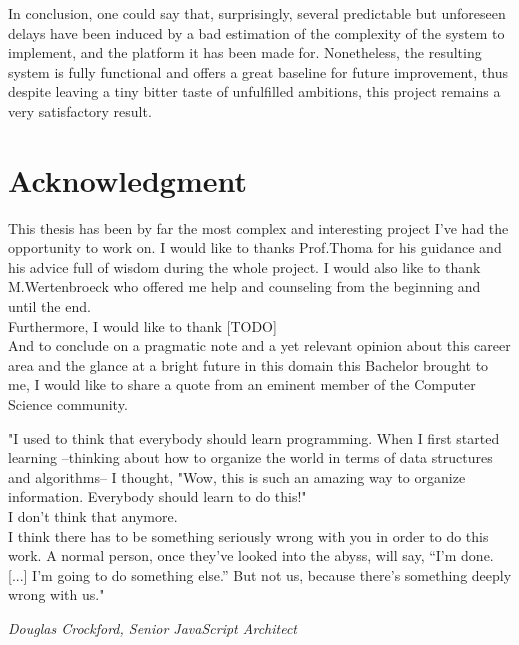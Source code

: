 In conclusion, one could say that, surprisingly, several predictable but unforeseen delays have been induced by a bad estimation of the complexity of the system to implement, and the platform it has been made for. Nonetheless, the resulting system is fully functional and offers a great baseline for future improvement, thus despite leaving a tiny bitter taste of unfulfilled ambitions, this project remains a very satisfactory result.

\section{Acknowledgment}

This thesis has been by far the most complex and interesting project I've had the opportunity to work on. I would like to thanks Prof.Thoma for his guidance and his advice full of wisdom during the whole project. I would also like to thank M.Wertenbroeck who offered me help and counseling from the beginning and until the end. \\

Furthermore, I would like to thank [TODO]\\

And to conclude on a pragmatic note and a yet relevant opinion about this career area and the glance at a bright future in this domain this Bachelor brought to me, I would like to share a quote from an eminent member of the Computer Science community.


\epigraph{"I used to think that everybody should learn programming. When I first started learning –thinking about how to organize the world in terms of data structures and algorithms– I thought, "Wow, this is such an amazing way to organize information. Everybody should learn to do this!" \\

I don't think that anymore. \\

I think there has to be something seriously wrong with you in order to do this work. A normal person, once they’ve looked into the abyss, will say, “I’m done.[...] I’m going to do something else.” But not us, because there’s something deeply wrong with us."}{\textit{Douglas Crockford, Senior JavaScript Architect}}